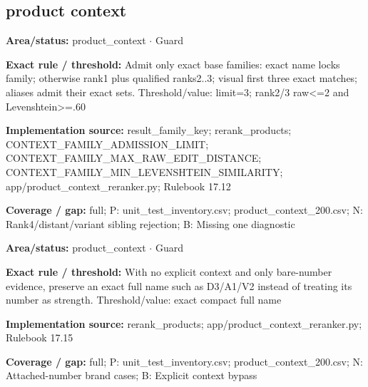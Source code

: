 \subsection*{product context}
\begin{tcolorbox}[enhanced,breakable,colback=white,colframe=Muted!45,boxrule=0.45pt,arc=1.5pt,left=6pt,right=6pt,top=5pt,bottom=5pt,title={\texttt{PC-ADMISSION-14}},title after break={\texttt{PC-ADMISSION-14}\ (continued)},fonttitle=\headingfont\bfseries\color{Navy},coltitle=Navy]
\textbf{Area/status:} product\_\allowbreak{}context $\boldsymbol{\cdot}$ Guard\par
\smallskip
\textbf{Exact rule / threshold:} Admit only exact base families: exact name locks family; otherwise rank1 plus qualified ranks2..3; visual first three exact matches; aliases admit their exact sets. Threshold/\allowbreak{}value: limit=3; rank2/\allowbreak{}3 raw<=2 and Levenshtein>=.60\par
\smallskip
\textbf{Implementation source:} result\_\allowbreak{}family\_\allowbreak{}key; rerank\_\allowbreak{}products; CONTEXT\_\allowbreak{}FAMILY\_\allowbreak{}ADMISSION\_\allowbreak{}LIMIT; CONTEXT\_\allowbreak{}FAMILY\_\allowbreak{}MAX\_\allowbreak{}RAW\_\allowbreak{}EDIT\_\allowbreak{}DISTANCE; CONTEXT\_\allowbreak{}FAMILY\_\allowbreak{}MIN\_\allowbreak{}LEVENSHTEIN\_\allowbreak{}SIMILARITY; app/\allowbreak{}product\_\allowbreak{}context\_\allowbreak{}reranker.py; Rulebook 17.12\par
\smallskip
\textbf{Coverage / gap:} full; P: unit\_\allowbreak{}test\_\allowbreak{}inventory.csv; product\_\allowbreak{}context\_\allowbreak{}200.csv; N: Rank4/\allowbreak{}distant/\allowbreak{}variant sibling rejection; B: Missing one diagnostic
\end{tcolorbox}
\begin{tcolorbox}[enhanced,breakable,colback=white,colframe=Muted!45,boxrule=0.45pt,arc=1.5pt,left=6pt,right=6pt,top=5pt,bottom=5pt,title={\texttt{PC-ATTACHED-NUMBER-GUARD-24}},title after break={\texttt{PC-ATTACHED-NUMBER-GUARD-24}\ (continued)},fonttitle=\headingfont\bfseries\color{Navy},coltitle=Navy]
\textbf{Area/status:} product\_\allowbreak{}context $\boldsymbol{\cdot}$ Guard\par
\smallskip
\textbf{Exact rule / threshold:} With no explicit context and only bare-number evidence, preserve an exact full name such as D3/\allowbreak{}A1/\allowbreak{}V2 instead of treating its number as strength. Threshold/\allowbreak{}value: exact compact full name\par
\smallskip
\textbf{Implementation source:} rerank\_\allowbreak{}products; app/\allowbreak{}product\_\allowbreak{}context\_\allowbreak{}reranker.py; Rulebook 17.15\par
\smallskip
\textbf{Coverage / gap:} full; P: unit\_\allowbreak{}test\_\allowbreak{}inventory.csv; product\_\allowbreak{}context\_\allowbreak{}200.csv; N: Attached-number brand cases; B: Explicit context bypass
\end{tcolorbox}
